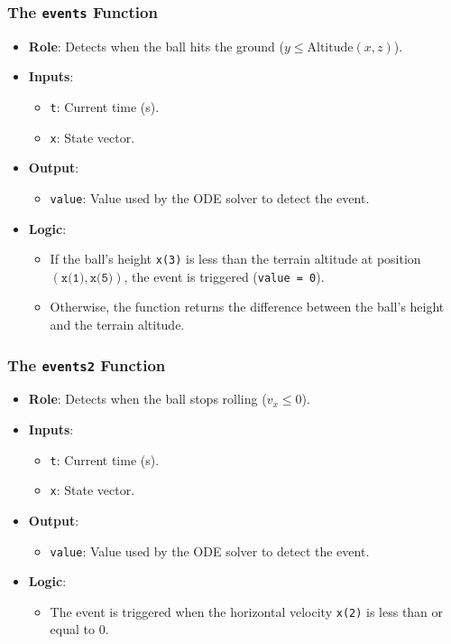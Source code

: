 \documentclass[10pt,a4paper]{report}
\begin{document}
\subsubsection{The \texttt{events} Function}
\begin{itemize}
    \item \textbf{Role}: Detects when the ball hits the ground (\(y \leq \text{Altitude}(x, z)\)).
    \item \textbf{Inputs}:
    \begin{itemize}
        \item \texttt{t}: Current time (s).
        \item \texttt{x}: State vector.
    \end{itemize}
    \item \textbf{Output}:
    \begin{itemize}
        \item \texttt{value}: Value used by the ODE solver to detect the event.
    \end{itemize}
    \item \textbf{Logic}:
    \begin{itemize}
        \item If the ball's height \texttt{x(3)} is less than the terrain altitude at position \((\texttt{x(1)}, \texttt{x(5)})\), the event is triggered (\texttt{value = 0}).
        \item Otherwise, the function returns the difference between the ball's height and the terrain altitude.
    \end{itemize}
\end{itemize}

\subsubsection{The \texttt{events2} Function}
\begin{itemize}
    \item \textbf{Role}: Detects when the ball stops rolling (\(v_x \leq 0\)).
    \item \textbf{Inputs}:
    \begin{itemize}
        \item \texttt{t}: Current time (s).
        \item \texttt{x}: State vector.
    \end{itemize}
    \item \textbf{Output}:
    \begin{itemize}
        \item \texttt{value}: Value used by the ODE solver to detect the event.
    \end{itemize}
    \item \textbf{Logic}:
    \begin{itemize}
        \item The event is triggered when the horizontal velocity \texttt{x(2)} is less than or equal to \(0\).
    \end{itemize}
\end{itemize}
\end{document}

